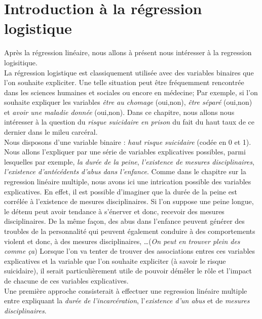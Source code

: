 \section{Introduction à la régression logistique}
Après la régression linéaire, nous allons à présent nous intéresser à la regression logisitique.\newline
\\
La régression logistique est classiquement utilisée avec des variables binaires que l'on souhaite expliciter. Une telle situation peut être fréquemment rencontrée dans les sciences humaines et sociales ou encore en médecine; Par exemple, si l'on souhaite expliquer les variables \textit{être au chomage} (oui,non), \textit{être séparé} (oui,non) et \textit{avoir une maladie donnée} (oui,non).\newline
Dans ce chapitre, nous allons nous intéresser à la question du \textit{risque suicidaire en prison} du fait du haut taux de ce dernier dans le mileu carcéral. \newline
\\
Nous disposons d'une variable binaire : \textit{haut risque suicidaire} (codée en 0 et 1). Nous allons l'expliquer par une série de variables explicatives possibles, parmi lesquelles par exemple, \textit{la durée de la peine}, \textit{l'existence de mesures disciplinaires}, \textit{l'existence d'antécédents d'abus dans l'enfance}.\newline
Comme dans le chapitre sur la regression linéaire multiple, nous avons ici une intrication possible des variables explicatives. En effet, il est possible d'imaginer que la durée de la peine est corrélée à l'existence de mesures disciplinaires. Si l'on suppose une peine longue, le détenu peut avoir tendance à s'énerver et donc, recevoir des mesures disciplinaires. De la même façon, des abus dans l'enfance peuvent générer des troubles de la personnalité qui peuvent également conduire à des comportements violent et donc, à des mesures disciplinaires, \dots (\textit{On peut en trouver plein des comme ça})\newline
Lorsque l'on va tenter de trouver des associations entres ces variables explicatives et la variable que l'on souhaite expliciter (à savoir le risque suicidaire), il serait particulièrement utile de pouvoir démêler le rôle et l'impact de chacune de ces variables explicatives.\newline
\\
Une première approche consisterait à effectuer une regression linéaire multiple entre expliquant la \textit{durée de l'incarcération}, l'\textit{existence d'un abus} et de \textit{mesures disciplinaires}.\newline

